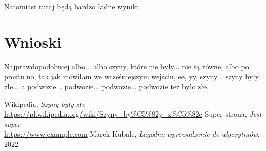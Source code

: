 \documentclass{article}
\begin{document}
Natomiast tutaj będą bardzo ładne wyniki.

\section{Wnioski}

Najprawdopodobniej albo... albo szyny, 
które nie były... nie są równe, 
albo po prostu no, tak jak mówiłam we 
wcześniejszym wejściu, ee, yy, szyny... 
szyny były złe... a podwozie... podwozie... 
podwozie... podwozie też było złe. \cite{szyny}

\renewcommand{\refname}{Źródła}
\begin{thebibliography}{100}
     Wikipedia, 
    \textit{Szyny były złe} 
    \\\url{https://pl.wikipedia.org/wiki/Szyny_by%C5%82y_z%C5%82e}
     Super strona,
    \textit{Jest super}
    \\\url{https://www.example.com}
     Marek Kubale,
    \textit{Łagodne wprowadzenie do algorytmów}, 2022
\end{thebibliography}
\end{document}
